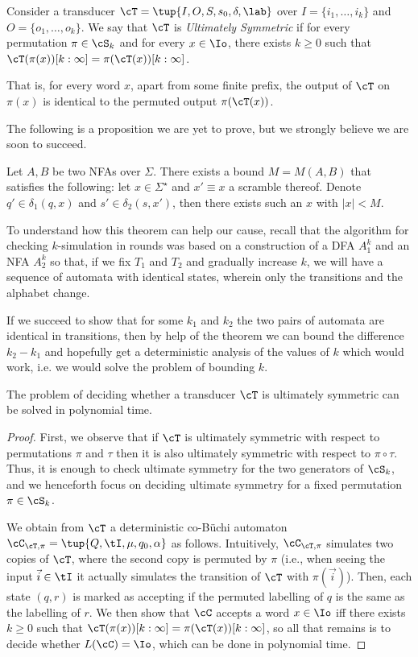 Consider a transducer $\cT=\tup{I,O,S,s_0,\delta,\lab}$ over $I=\{i_1,\ldots,i_k\}$ and $O=\{o_1,\ldots,o_k\}$. We say that $\cT$ is \emph{Ultimately Symmetric} if for every permutation $\pi\in \cS_k$ and for every $x\in \Io$, there exists $k\ge 0$ such that $\cT(\pi(x))[k:\infty]=\pi(\cT(x))[k:\infty]$.

That is, for every word $x$, apart from some finite prefix, the output of $\cT$ on $\pi(x)$ is identical to the permuted output $\pi(\cT(x))$.

The following is a proposition we are yet to prove, but we strongly believe we are soon to succeed.

\begin{hypothesis}
Let $A,B$ be two NFAs over $\Sigma$. There exists a bound $M=M(A,B)$ that satisfies the following: let $x\in \Sigma^\star$ and $x'\equiv x$ a scramble thereof. Denote $q'\in\delta_1(q,x)$ and $s'\in\delta_2(s,x')$, then there exists such an $x$ with $|x|<M$.
\end{hypothesis}

To understand how this theorem can help our cause, recall that the algorithm for checking $k$-simulation in rounds was based on a construction of a DFA $A_1^k$ and an NFA $A_2^k$ so that, if we fix $T_1$ and $T_2$ and gradually increase $k$, we will have a sequence of automata with identical states, wherein only the transitions and the alphabet change.

If we succeed to show that for some $k_1$ and $k_2$ the two pairs of automata are identical in transitions, then by help of the theorem we can bound the difference $k_2-k_1$ and hopefully get a deterministic analysis of the values of $k$ which would work, i.e. we would solve the problem of bounding $k$.

\begin{theorem}
	The problem of deciding whether a transducer $\cT$ is ultimately symmetric can be solved in polynomial time.
\end{theorem}
\begin{proof}
	First, we observe that if $\cT$ is ultimately symmetric with respect to permutations $\pi$ and $\tau$ then it is also ultimately symmetric with respect to $\pi\circ\tau$. Thus, it is enough to check ultimate symmetry for the two generators of $\cS_k$, and we henceforth focus on deciding ultimate symmetry for a fixed permutation $\pi\in \cS_k$.
	
	We obtain from $\cT$ a deterministic co-B\"uchi automaton $\cC_{\cT,\pi}=\tup{Q,\tI,\mu,q_0,\alpha}$ as follows. Intuitively, $\cC_{\cT,\pi}$ simulates two copies of $\cT$, where the second copy is permuted by $\pi$ (i.e., when seeing the input $\vec{i}\in \tI$ it actually simulates the transition of $\cT$ with $\pi(\vec{i})$). Then, each state $(q,r)$ is marked as accepting if the permuted labelling of $q$ is the same as the labelling of $r$. 
	We then show that $\cC$ accepts a word $x\in \Io$ iff there exists $k\ge 0$ such that $\cT(\pi(x))[k:\infty]=\pi(\cT(x))[k:\infty]$, so all that remains is to decide whether $L(\cC)=\Io$, which can be done in polynomial time.
	
	
\end{proof}

